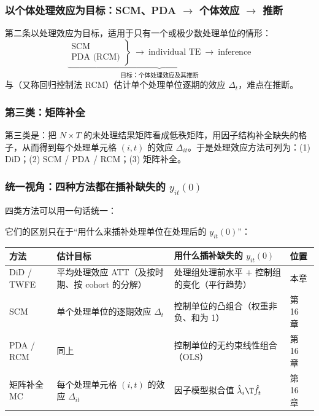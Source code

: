 \subsubsection{以个体处理效应为目标：SCM、PDA \texorpdfstring{$\to$}{->} 个体效应 \texorpdfstring{$\to$}{->} 推断}

第二条以处理效应为目标，适用于只有一个或极少数处理单位的情形：
\[
\underbrace{\left.\begin{array}{l}\text{SCM}\\ \text{PDA (RCM)}\end{array}\right\}\ \longrightarrow\ \text{individual TE}\ \longrightarrow\ \text{inference}}_{\text{目标：个体处理效应及其推断}}
\]
与（又称回归控制法 RCM）估计单个处理单位逐期的效应 $\Delta_t$，难点在推断。

\subsubsection{第三类：矩阵补全}

第三类是：把 $N\times T$ 的未处理结果矩阵看成低秩矩阵，用因子结构补全缺失的格子，从而得到每个处理单元格 $(i,t)$ 的效应 $\Delta_{it}$。于是处理效应方法可列为：(1) DiD；(2) SCM / PDA / RCM；(3) 矩阵补全。

\subsubsection{统一视角：四种方法都在插补缺失的 \texorpdfstring{$y_{it}(0)$}{y\_it(0)}}

四类方法可以用一句话统一：
\begin{center}
\end{center}
它们的区别只在于“用什么来插补处理单位在处理后的 $y_{it}(0)$”：

\begin{center}
\small
\begin{tabularx}{\linewidth}{@{}p{2.0cm}LLp{2.1cm}@{}}
\toprule
方法 & 估计目标 & 用什么插补缺失的 $y_{it}(0)$ & 位置\\
\midrule
DiD / TWFE & 平均处理效应 ATT（及按时期、按 cohort 的分解） & 处理组处理前水平 $+$ 控制组的变化（平行趋势） & 本章\\
SCM & 单个处理单位的逐期效应 $\Delta_t$ & 控制单位的凸组合（权重非负、和为 1） & 第 16 章\\
PDA / RCM & 同上 & 控制单位的无约束线性组合（OLS） & 第 16 章\\
矩阵补全 MC & 每个处理单元格 $(i,t)$ 的效应 $\Delta_{it}$ & 因子模型拟合值 $\hat\lambda_i\T\hat f_t$ & 第 16 章\\
\bottomrule
\end{tabularx}
\end{center}

